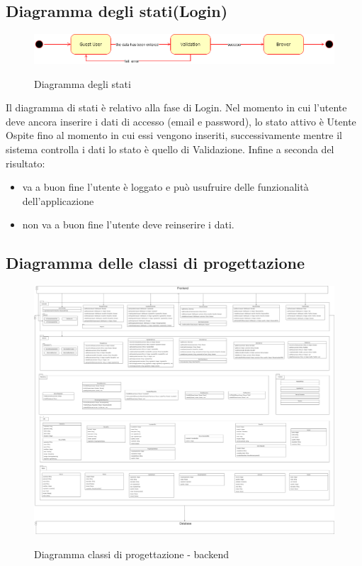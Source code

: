 \documentclass{article}
\begin{document}
\subsection{Diagramma degli stati(Login)}
\begin{figure}[h!]
\centering
\includegraphics[scale=0.5]{State Diagram_Registrazione (1).png}
\label{fig:Diagramma degli stati}
\caption{Diagramma degli stati}
\end{figure}
Il diagramma di stati è relativo alla fase di Login. Nel momento in cui l’utente deve ancora inserire i dati di accesso (email e password), lo stato
attivo è Utente Ospite fino al momento in cui essi vengono inseriti, successivamente mentre il sistema controlla i dati lo stato è quello di
Validazione. Infine a seconda del risultato:\\
\begin{itemize}
    \item va a buon fine l’utente è loggato e può usufruire delle funzionalità dell’applicazione
    \item non va a buon fine l’utente deve reinserire i dati.
\end{itemize}
\clearpage
\subsection{Diagramma delle classi di progettazione}
\begin{figure}[h!]
\includegraphics[scale=0.14]{DiagrammaClassiProgettazione-backend.png}
\label{fig:Diagramma classi di progettazione - backend}
\caption{Diagramma classi di progettazione - backend}
\end{figure}
\clearpage
\end{document}

